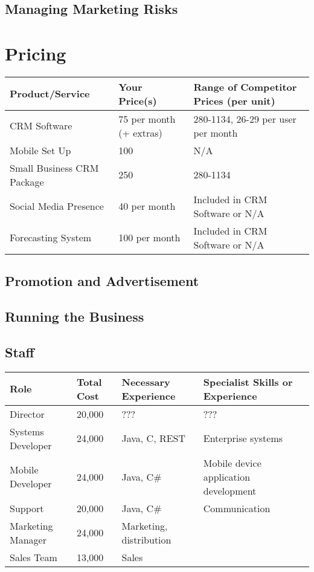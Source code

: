\documentclass[DIV=calc, paper=a4, fontsize=11pt]{scrartcl}	 %
\begin{document}
\subsection{Managing Marketing Risks}

\section{Pricing}

\begin{tabular}{|l|l|l|} \hline
Product/Service    & Your Price(s) & Range of Competitor Prices (per unit) \\ \hline
CRM Software       & 75 per month (+ extras)  & 280-1134, 26-29 per user per month \\ \hline
Mobile Set Up      & 100           & N/A \\ \hline
Small Business CRM Package & 250   & 280-1134 \\ \hline
Social Media Presence & 40 per month & Included in CRM Software or N/A \\ \hline
Forecasting System & 100 per month & Included in CRM Software or N/A \\ \hline
\end{tabular}

\subsection{Promotion and Advertisement}

\subsection{Running the Business}

\subsection{Staff}
\begin{tabular}{|l|l|l|l|}\hline
Role              & Total Cost & Necessary Experience & Specialist Skills or Experience \\ \hline
Director          & 20,000     & ???                     & ??? \\ \hline
Systems Developer & 24,000     & Java, C, REST           & Enterprise systems \\ \hline
Mobile Developer  & 24,000     & Java, C\#               & Mobile device application development \\ \hline
Support           & 20,000     & Java, C\#               & Communication \\ \hline
Marketing Manager & 24,000     & Marketing, distribution & \\ \hline
Sales Team        & 13,000     & Sales                   & \\ \hline
\end{tabular}
\end{document}
